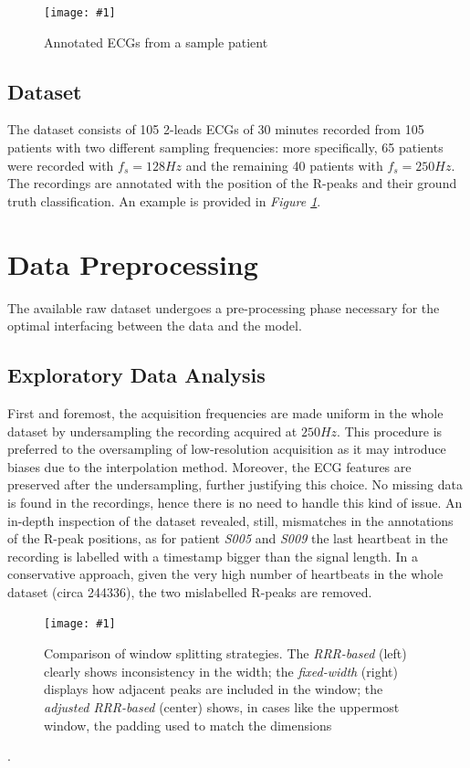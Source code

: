 \documentclass[conference]{IEEEtran}
\newcommand{\fig}[1]{\textit{Figure \ref{#1}}}
\newcommand{\addfigure}[3]{
    \begin{figure}
        \texttt{[image: \#1]}
        \caption{#2}
        \label{#3}
    \end{figure}
}
\begin{document}
    \addfigure
        {img/example.jpg}
        {Annotated ECGs from a sample patient}
        {fig:examples}

\subsection{Dataset}
    The dataset consists of 105 2-leads ECGs of 30 minutes recorded from 105 patients
    with two different sampling frequencies: more specifically, 65 patients were
    recorded with $f_s = 128 Hz$ and the remaining 40 patients with $f_s =
    250Hz$. The recordings are annotated with the position of the R-peaks and
    their ground truth classification. An example is provided in \fig{fig:examples}.

\section{Data Preprocessing}
    The available raw dataset undergoes a pre-processing phase necessary for the
    optimal interfacing between the data and the model. 

\subsection{Exploratory Data Analysis}
    First and foremost, the acquisition frequencies are made uniform in the
    whole dataset by undersampling the recording acquired at $250Hz$. This
    procedure is preferred to the oversampling of low-resolution acquisition as
    it may introduce biases due to the interpolation method. Moreover, the ECG
    features are preserved after the undersampling, further justifying this
    choice. No missing data is found in the recordings, hence there is no need
    to handle this kind of issue.
    An in-depth inspection of the dataset revealed, still, mismatches in the
    annotations of the R-peak positions, as for patient \textit{S005} and
    \textit{S009} the last heartbeat in the recording is labelled with a
    timestamp bigger than the signal length. In a conservative approach, given
    the very high number of heartbeats in the whole dataset (circa 244336), the
    two mislabelled R-peaks are removed.

    \addfigure
        {img/windowing.jpg}
        {Comparison of window splitting strategies. The \textit{RRR-based} (left) clearly shows
        inconsistency in the width; the \textit{fixed-width} (right) displays how
        adjacent peaks are included in the window; the \textit{adjusted RRR-based}
        (center) shows, in cases like the uppermost window, the padding used to match
        the dimensions}
        {fig:windowing}.
\end{document}
